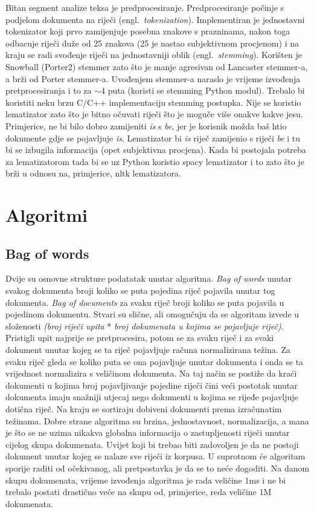 \documentclass[a4paper,12pt]{article}
\newcommand{\engl}[1]{(engl.~\emph{#1})}
\begin{document}
Bitan segment analize teksa je predprocesiranje. Predprocesiranje počinje s podjelom dokumenta na riječi \engl{tokenization}. Implementiran je jednostavni tokenizator koji prvo zamijenjuje posebna znakove s prazninama, nakon toga odbacuje riječi duže od 25 znakova (25 je nastao subjektivnom procjenom) i na kraju se radi svođenje riječi na jednostavniji oblik \engl{stemming}. Korišten je Snowball (Porter2) stemmer zato što je manje agresivan od Lancaster stemmer-a, a brži od Porter stemmer-a. Uvođenjem stemmer-a naraslo je vrijeme izvođenja pretprocesiranja i to za $\sim$4 puta (koristi se stemming Python modul). Trebalo bi koristiti neku brzu C/C++ implementaciju stemming postupka. Nije se koristio lematizator zato što je bitno očuvati riječi što je moguče više onakve kakve jesu. Primjerice, ne bi bilo dobro zamijeniti \textit{is} s \textit{be}, jer je korisnik možda baš htio dokumente gdje se pojavljuje \textit{is}. Lematizator bi \textit{is} riječ zamijenio s riječi \textit{be} i tu bi se izbugila informacija (opet subjektivna procjena). Kada bi postojala potreba za lematizatorom tada bi se uz Python koristio spacy lematizator i to zato što je brži u odnosu na, primjerice, nltk lematizatora. 

\section{Algoritmi}

\subsection{Bag of words}

Dvije su osnovne strukture podatatak unutar algoritma. \textit{Bag of words} unutar svakog dokumenta broji koliko se puta pojedina riječ pojavila unutar tog dokumenta. \textit{Bag of documents} za svaku riječ broji koliko se puta pojavila u pojedinom dokumentu. Stvari su slične, ali omogučuju da se algoritam izvede u složenosti \textit{(broj riječi upita} * \textit{broj dokumenata u kojima se pojavljuje riječ)}. Pristigli upit najprije se pretprocesira, potom se za svaku riječ i za svaki dokument unutar kojeg se ta riječ pojavljuje računa normalizirana težina. Za svaku riječ  gleda se koliko puta se ona pojavljuje unutar dokumenta i onda se ta vrijednost normalizira s veličinom dokumenta. Na taj način se postiže da kraći dokumenti u kojima broj pojavljivanje pojedine riječi čini veći postotak unutar dokumenta imaju snažniji utjecaj nego dokumenti u kojima se rijeđe pojavljuje dotična riječ. Na kraju se sortiraju dobiveni dokumenti prema izračunatim težinama. Dobre strane algoritma su brzina, jednostavnost, normalizacija, a mana je što se ne uzima nikakva globalna informacija o zastupljenosti riječi unutar cijelog skupa dokumenata. Uvijet koji bi trebao biti zadovoljen je da ne postoji dokument unutar kojeg se nalaze sve riječi iz korpusa. U suprotnom će algoritam sporije raditi od očekivanog, ali pretpostavka je da se to neće dogoditi. Na danom skupu dokumenata, vrijeme izvođenja algoritma je rada veličine 1ms i ne bi trebalo postati drastično veće na skupu od, primjerice, reda veličine 1M dokumenata.
\end{document}
